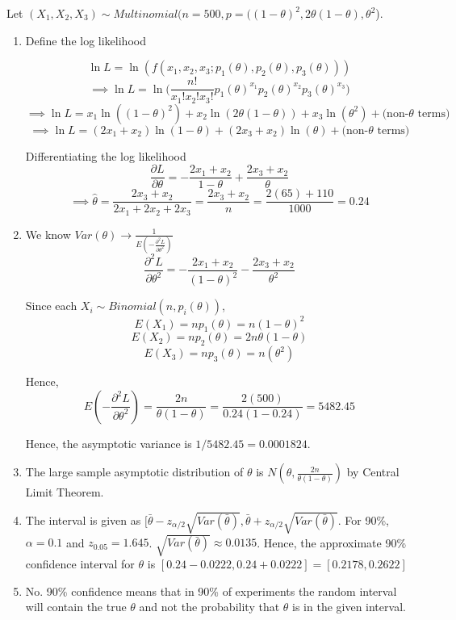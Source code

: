 \documentclass[12pt, oneside]{article}
\begin{document}
\begin{enumerate}
Let $(X_1, X_2, X_3) \sim Multinomial(n = 500, p = ((1 - \theta)^2, 2\theta(1 - \theta), \theta^2$).

\begin{enumerate}
    \item Define the log likelihood
    
    \[ \ln L = \ln(f(x_1, x_2, x_3 ; p_1(\theta), p_2(\theta), p_3(\theta))) \]
    \[ \implies \ln L =  \ln \bigg( \frac{n!}{x_1!x_2!x_3!} p_1(\theta)^{x_1} p_2(\theta)^{x_2} p_3(\theta)^{x_3} \bigg) \]
    \[\implies \ln L = x_1 \ln((1 - \theta)^2) + x_2\ln(2\theta(1 - \theta)) +x_3\ln(\theta^2) + \text{(non-}\theta\text{ terms)} \]
    \[\implies \ln L = (2x_1 + x_2)\ln(1 - \theta) + (2x_3 + x_2)\ln(\theta) + \text{(non-}\theta\text{ terms)} \]
    
    Differentiating the log likelihood
    \[ \frac{\partial{L}}{\partial\theta} = -\frac{2x_1 + x_2}{1 - \theta} + \frac{2x_3 + x_2}{\theta}\]
    \[ \implies \hat \theta = \frac{2x_3 + x_2}{2x_1 + 2x_2 + 2x_3} =  \frac{2x_3 + x_2}{n} = \frac{2(65) + 110}{1000} = 0.24\]
    
    \item We know $Var(\theta) \to \frac{1}{E(-\frac{\partial^2 L}{\partial \theta^2})}$
    \[ \frac{\partial^2 L}{\partial \theta^2} = -\frac{2x_1 + x_2}{(1-\theta)^2} - \frac{2x_3 + x_2}{\theta^2} \]
    
    Since each $X_i \sim Binomial(n,p_i(\theta))$,
    \[ E(X_1) = np_1(\theta) = n(1-\theta)^2 \]
    \[ E(X_2) = np_2(\theta) = 2n\theta(1-\theta) \]
    \[ E(X_3) = np_3(\theta) = n(\theta^2) \]
    
    Hence,
    \[ E(-\frac{\partial^2 L}{\partial \theta^2}) = \frac{2n}{\theta(1-\theta)} = \frac{2(500)}{0.24(1-0.24)} = 5482.45\]
    
    Hence, the asymptotic variance is $1/5482.45 = 0.0001824$.
    
    \item The large sample asymptotic distribution of $\theta$ is $N(\theta, \frac{2n}{\theta(1-\theta)})$ by Central Limit Theorem.
    
    \item The interval is given as $[\bar\theta - z_{\alpha/2} \sqrt{Var(\bar \theta)} ,\bar\theta + z_{\alpha/2} \sqrt{Var(\bar \theta)}$. For 90\%, $\alpha=0.1$ and $z_{0.05} = 1.645$. $\sqrt{Var(\bar \theta)} \approx 0.0135$. 
    Hence, the approximate 90\% confidence interval for $\theta$ is $[0.24-0.0222,0.24+0.0222] = [0.2178, 0.2622]$
    
    \item No. 90\% confidence means that in 90\% of experiments the random interval will contain the true $\theta$ and not the probability that $\theta$ is in the given interval.
    
    
    
\end{enumerate}


\end{enumerate}
\end{document}

